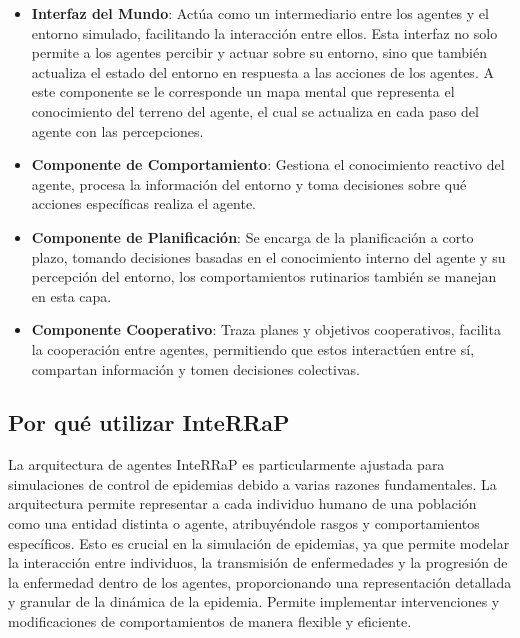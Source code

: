\begin{itemize}
    \item \textbf{Interfaz del Mundo}: Actúa como un intermediario entre los agentes y el entorno simulado, facilitando la interacción entre ellos. Esta interfaz no solo permite a los agentes percibir y actuar sobre su entorno, sino que también actualiza el estado del entorno en respuesta a las acciones de los agentes. A este componente se le corresponde un mapa mental que representa el conocimiento del terreno del agente, el cual se actualiza en cada paso del agente con las percepciones.
    \item \textbf{Componente de Comportamiento}: Gestiona el conocimiento reactivo del agente, procesa la información del entorno y toma decisiones sobre qué acciones específicas realiza el agente.
    \item \textbf{Componente de Planificación}: Se encarga de la planificación a corto plazo, tomando decisiones basadas en el conocimiento interno del agente y su percepción del entorno, los comportamientos rutinarios también se manejan en esta capa.
    \item \textbf{Componente Cooperativo}: Traza planes y objetivos cooperativos, facilita la cooperación entre agentes, permitiendo que estos interactúen entre sí, compartan información y tomen decisiones colectivas.
\end{itemize}

\subsection{Por qué utilizar InteRRaP}
La arquitectura de agentes InteRRaP es particularmente ajustada para simulaciones de control de epidemias debido a varias razones fundamentales. La arquitectura permite representar a cada individuo humano de una población como una entidad distinta o agente, atribuyéndole rasgos y comportamientos específicos. Esto es crucial en la simulación de epidemias, ya que permite modelar la interacción entre individuos, la transmisión de enfermedades y la progresión de la enfermedad dentro de los agentes, proporcionando una representación detallada y granular de la dinámica de la epidemia. Permite implementar intervenciones y modificaciones de comportamientos de manera flexible y eficiente.

